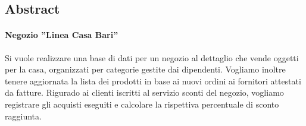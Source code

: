 \subsection{Abstract}
\paragraph*{Negozio ''Linea Casa Bari''}
Si vuole realizzare una base di dati per un negozio al dettaglio che vende oggetti per la casa, organizzati per categorie gestite dai dipendenti. Vogliamo inoltre tenere aggiornata la lista dei prodotti in base ai nuovi ordini ai fornitori attestati da fatture. Rigurado ai clienti iscritti al servizio sconti del negozio, vogliamo registrare gli acquisti eseguiti e calcolare la rispettiva percentuale di sconto raggiunta.
